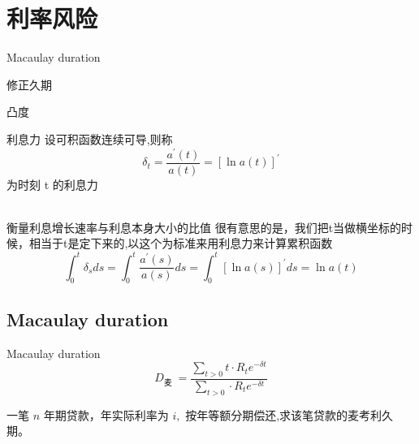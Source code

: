 \chapter{利率风险}
\begin{introduction}
	\item Macaulay duration
	\item 修正久期
	\item 凸度
\end{introduction}
\begin{definition}{利息力}
\noindent		设可积函数连续可导,则称
\[
\delta_{t}=\frac{a^{\prime}(t)}{a(t)}=[\ln a(t)]^{\prime}
\]
为时刻 t 的利息力
		\end{definition}
		\\ 衡量利息增长速率与利息本身大小的比值
		很有意思的是，我们把t当做横坐标的时候，相当于t是定下来的,以这个为标准来用利息力来计算累积函数
		$$\int_{0}^{t} \delta_{s} d s=\int_{0}^{t} \frac{a^{\prime}(s)}{a(s)} d s=\int_{0}^{t}[\ln a(s)]^{\prime} d s=\ln a(t)$$
\section{Macaulay duration}
	\begin{definition}{Macaulay duration}
$$D_{\text {麦 }}=\frac{\sum_{t>0} t \cdot R_{t} e^{-\delta t}}{\sum_{t>0}  \cdot R_{t} e^{-\delta t}}$$
\end{definition}
\begin{note}
一笔 $n$ 年期贷款，年实际利率为 $i,$ 按年等额分期偿还,求该笔贷款的麦考利久期。
\end{note}
\begin{solution}
$$\begin{aligned}
D_{} &==} \\
&=\frac{\ddot{a}_{\angles{n}}-n v^{n}}{i \cdot a_{\angles{n }}}=\frac{(1+i) a_{\angles{n }}}{i \cdot a_{\angles{n }}}-\frac{n v^{n}}{i \cdot \frac{1-v^{n}}{i}} \\
&=\frac{1+i}{i}-\frac{n}{(1+i)^{n}-1}
\end{aligned}$$
\end{solution}
